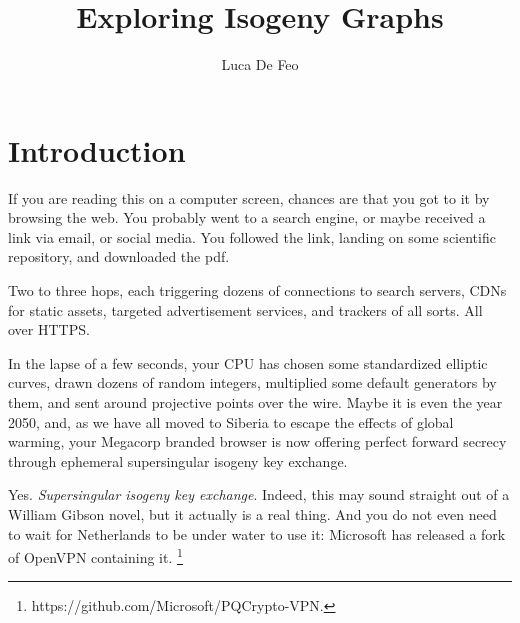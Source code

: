 \documentclass{report}
\title{Exploring Isogeny Graphs}
\author{Luca De Feo}
\theoremstyle{plain}
\theoremstyle{definition}
\begin{document}
\maketitle
\thispagestyle{fancy}
\renewcommand{\headrulewidth}{0pt}
\renewcommand{\footrulewidth}{0.4pt}
\cfoot{\doclicenseThis}


\tableofcontents
\clearpage


%


\section*{Introduction}

If you are reading this on a computer screen, chances are that you got
to it by browsing the web. %
You probably went to a search engine, or maybe received a link via
email, or social media. %
You followed the link, landing on some scientific repository, and
downloaded the pdf. %

Two to three hops, each triggering dozens of connections to search
servers, CDNs for static assets, targeted advertisement services, and
trackers of all sorts. %
All over HTTPS. %

In the lapse of a few seconds, your CPU has chosen some standardized
elliptic curves, drawn dozens of random integers, multiplied some
default generators by them, and sent around projective points over the
wire. %
Maybe it is even the year 2050, and, as we have all moved to Siberia
to escape the effects of global warming, your Megacorp branded browser
is now offering perfect forward secrecy through ephemeral
supersingular isogeny key exchange.

Yes. \emph{Supersingular isogeny key exchange}. %
Indeed, this may sound straight out of a William Gibson novel, but it
actually is a real thing. %
And you do not even need to wait for Netherlands to be under water to
use it: Microsoft has released a fork of OpenVPN containing it.%
\footnote{https://github.com/Microsoft/PQCrypto-VPN.} %
\end{document}
